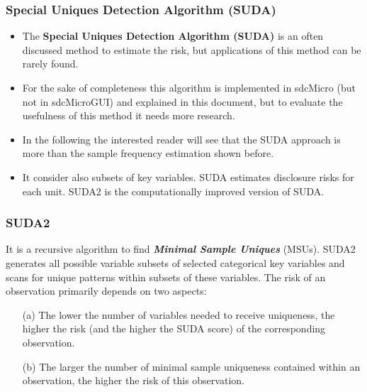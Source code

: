 \documentclass{beamer}
\begin{document}
	\begin{frame}
		
		\frametitle{Special Uniques Detection Algorithm (SUDA)}
		\begin{itemize}
			\item The \textbf{Special Uniques Detection Algorithm (SUDA)} is an often discussed method
			to estimate the risk, but applications of this method can be rarely found. 
			\item For
			the sake of completeness this algorithm is implemented in sdcMicro (but not in
			sdcMicroGUI) and explained in this document, but to evaluate the usefulness of
			this method it needs more research. 
			
			\item In the following the interested reader will
			see that the SUDA approach is more than the sample frequency estimation shown
			before. 
			\item It consider also subsets of key variables. SUDA estimates disclosure risks
			for each unit. SUDA2  is the computationally improved
			version of SUDA. 
		\end{itemize}
	\end{frame}
	
	\begin{frame}
		\frametitle{SUDA2}
		It is a recursive algorithm to find \textbf{\textit{Minimal Sample Uniques}}
		(MSUs). SUDA2 generates all possible variable subsets of selected categorical key
		variables and scans for unique patterns within subsets of these variables. The risk
		of an observation primarily depends on two aspects:
		
		\begin{itemize}
			\item[(a)] The lower the number of variables needed to receive uniqueness, the higher
			the risk (and the higher the SUDA score) of the corresponding observation.
			\item[(b)] The larger the number of minimal sample uniqueness contained within an
			observation, the higher the risk of this observation.
		\end{itemize}
		
	\end{frame}
	
\end{document}
